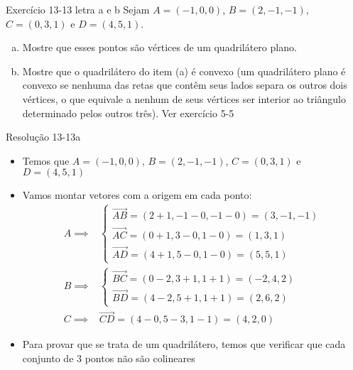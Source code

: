 \begin{frame}{Exercício 13-13 letra a e b}
    Sejam \(A=(-1,0,0)\), \(B=(2,-1,-1)\), \(C=(0,3,1)\) e \(D=(4,5,1)\).
    \begin{enumerate}[(a)]
        \item Mostre que esses pontos são vértices de um quadrilátero plano.
        \item Mostre que o quadrilátero do item (a) é convexo (um quadrilátero
            plano é convexo se nenhuma das retas que contêm seus lados separa
            os outros dois vértices, o que equivale a nenhum de seus vértices
            ser interior ao triângulo determinado pelos outros três). 
            \alert{Ver exercício 5-5}
    \end{enumerate}
\end{frame}

\begin{frame}{Resolução 13-13a}
    \begin{itemize}
        \item Temos que \(A=(-1,0,0)\), \(B=(2,-1,-1)\), \(C=(0,3,1)\) e \(D=(4,5,1)\) 
        \item Vamos montar vetores com a origem em cada ponto:
            \begin{align*}
                A \implies &
                \begin{cases}
                    \vec{AB}=(2+1,-1-0,-1-0)=(3,-1,-1) \\
                    \vec{AC}=(0+1,3-0,1-0)=(1,3,1) \\
                    \vec{AD}=(4+1,5-0,1-0)=(5,5,1)
                \end{cases} \\
                B \implies &
                \begin{cases}
                    \vec{BC}=(0-2,3+1,1+1)=(-2,4,2) \\
                    \vec{BD}=(4-2,5+1,1+1)=(2,6,2)
                \end{cases} \\
                C \implies & \vec{CD}=(4-0,5-3,1-1)=(4,2,0)
            \end{align*}
        \item Para provar que se trata de um quadrilátero, temos que verificar que cada
            conjunto de 3 pontos não são colineares
    \end{itemize}
\end{frame}

